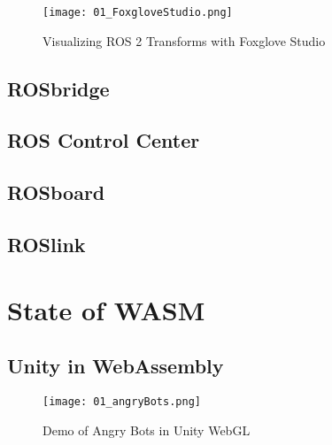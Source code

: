         \begin{figure}[htbp]
            \centering
            \texttt{[image: 01\_FoxgloveStudio.png]}
            \caption{Visualizing ROS 2 Transforms with Foxglove Studio}
        \end{figure}

        \subsection{ROSbridge}

    \subsection{ROS Control Center}

    \subsection{ROSboard}

    \subsection{ROSlink}

\section{State of WASM}

    \subsection{Unity in WebAssembly}


    \begin{figure}[htbp]
        \centering
        \texttt{[image: 01\_angryBots.png]}
        \caption{Demo of Angry Bots in Unity WebGL}\label{fig:unity}
    \end{figure}
